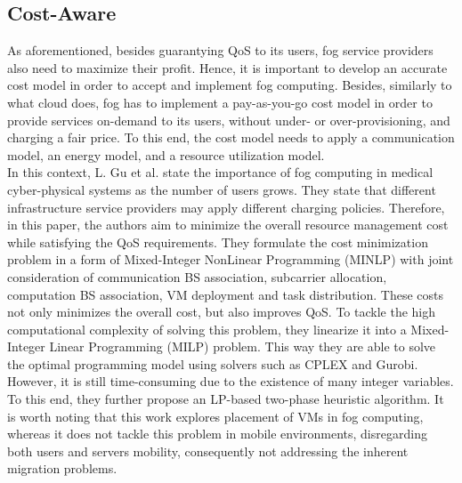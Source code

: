 
\subsection{Cost-Aware}\label{sec:cost}
As aforementioned, besides guarantying QoS to its users, fog service providers also need to maximize their profit. Hence, it is important to develop an accurate cost model in order to accept and implement fog computing. Besides, similarly to what cloud does, fog has to implement a pay-as-you-go cost model in order to provide services on-demand to its users, without under- or over-provisioning, and charging a fair price. To this end, the cost model needs to apply a communication model, an energy model, and a resource utilization model.\\
\noindent\tab In this context, L. Gu et al. \cite{gu2017cost} state the importance of fog computing in medical cyber-physical systems as the number of users grows. They state that different infrastructure service providers may apply different charging policies. Therefore, in this paper, the authors aim to minimize the overall resource management cost while satisfying the QoS requirements. They formulate the cost minimization problem in a form of Mixed-Integer NonLinear Programming (MINLP) with joint consideration of communication BS association, subcarrier allocation, computation BS association, VM deployment and task distribution. These costs not only minimizes the overall cost, but also improves QoS. To tackle the high computational complexity of solving this problem, they linearize it into a Mixed-Integer Linear Programming (MILP) problem. This way they are able to solve the optimal programming model using solvers such as CPLEX and Gurobi. However, it is still time-consuming due to the existence of many integer variables. To this end, they further propose an LP-based two-phase heuristic algorithm. It is worth noting that this work explores placement of VMs in fog computing, whereas it does not tackle this problem in mobile environments, disregarding both users and servers mobility, consequently not addressing the inherent migration problems.\\ %
